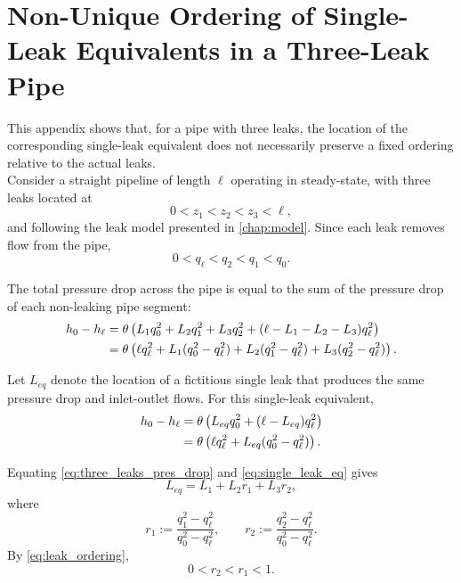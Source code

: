 \chapter{Non-Unique Ordering of Single-Leak Equivalents in a Three-Leak Pipe}
\label{app:3_leak_eq_proof}

This appendix shows that, for a pipe with three leaks, the location of the corresponding single-leak equivalent does not necessarily preserve a fixed ordering relative to the actual leaks.\\

Consider a straight pipeline of length $\ell$ operating in steady-state, with three leaks located at
\[
0<z_1<z_2<z_3<\ell,
\]
and following the leak model presented in \autoref{chap:model}. Since each leak removes flow from the pipe,
\begin{equation}
\label{eq:leak_ordering}
0<q_{\ell}<q_2<q_1<q_0.
\end{equation}

The total pressure drop across the pipe is equal to the sum of the pressure drop of each non-leaking pipe segment:
\begin{align}
h_0-h_{\ell}
&=
\theta\left(
L_1q_0^2
+L_2q_1^2
+L_3q_2^2
+(\ell-L_1-L_2-L_3)q_{\ell}^2
\right) \notag \\
&=
\theta\left(
\ell q_{\ell}^2
+L_1(q_0^2-q_{\ell}^2)
+L_2(q_1^2-q_{\ell}^2)
+L_3(q_2^2-q_{\ell}^2)
\right).
\label{eq:three_leaks_pres_drop}
\end{align}

Let $L_{eq}$ denote the location of a fictitious single leak that produces the same pressure drop and inlet-outlet flows. For this single-leak equivalent,
\begin{align}
h_0-h_{\ell}
&=
\theta\left(
L_{eq}q_0^2
+(\ell-L_{eq})q_{\ell}^2
\right) \notag \\
&=
\theta\left(
\ell q_{\ell}^2
+L_{eq}(q_0^2-q_{\ell}^2)
\right).
\label{eq:single_leak_eq}
\end{align}

Equating \cref{eq:three_leaks_pres_drop} and \cref{eq:single_leak_eq} gives
\begin{equation*}
L_{eq}
=
L_1
+L_2r_1
+L_3r_2,
\end{equation*}
where
\begin{equation*}
r_1
:=
\dfrac{q_1^2-q_{\ell}^2}{q_0^2-q_{\ell}^2},
\qquad
r_2
:=
\dfrac{q_2^2-q_{\ell}^2}{q_0^2-q_{\ell}^2}.
\end{equation*}
By \cref{eq:leak_ordering},
\begin{equation}
\label{eq:ratio_bounds}
0<r_2<r_1<1.
\end{equation}

